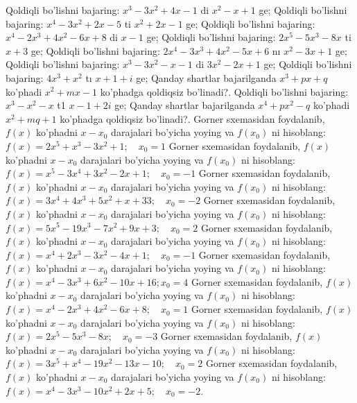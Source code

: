 Qoldiqli bo’lishni bajaring:  $x^3-3 x^2+4 x-1$ di $x^2-x+1$ ge;
Qoldiqli bo’lishni bajaring: $x^4-3 x^2+2 x-5$ ti $x^2+2 x-1$ ge;
Qoldiqli bo’lishni bajaring: $x^4-2 x^3+4 x^2-6 x+8$ di $x-1$ ge;
Qoldiqli bo’lishni bajaring: $2 x^5-5 x^3-8 x$ ti $x+3$ ge;
Qoldiqli bo’lishni bajaring: $2 x^4-3 x^3+4 x^2-5 x+6$ nı $x^2-3 x+1$ ge;
Qoldiqli bo’lishni bajaring: $x^3-3 x^2-x-1$ di $3 x^2-2 x+1$ ge;
Qoldiqli bo’lishni bajaring: $4 x^3+x^2$ tı $x+1+i$ ge;
Qanday shartlar bajarilganda $x^3+p x+q$ ko’phadi $x^2+m x-1$ ko’phadga qoldiqsiz bo’linadi?.
Qoldiqli bo’lishni bajaring:  $x^3-x^2-x$ t1 $x-1+2 i$ ge;
Qanday shartlar bajarilganda $x^4+p x^2-q$ ko’phadi $x^2+m q+1$ ko’phadga qoldiqsiz bo’linadi?.
Gorner sxemasidan foydalanib, $f(x)$ ko’phadni $x-x_0$ darajalari bo’yicha yoying va $f\left(x_0\right)$ ni hisoblang:  $f(x)=2 x^5+x^3-3 x^2+1 ; \quad x_0=1$
Gorner sxemasidan foydalanib, $f(x)$ ko’phadni $x-x_0$ darajalari bo’yicha yoying va $f\left(x_0\right)$ ni hisoblang: $f(x)=x^5-3 x^4+3 x^2-2 x+1 ; \quad x_0=-1$
Gorner sxemasidan foydalanib, $f(x)$ ko’phadni $x-x_0$ darajalari bo’yicha yoying va $f\left(x_0\right)$ ni hisoblang: $f(x)=3 x^4+4 x^3+5 x^2+x+33 ; \quad x_0=-2$
Gorner sxemasidan foydalanib, $f(x)$ ko’phadni $x-x_0$ darajalari bo’yicha yoying va $f\left(x_0\right)$ ni hisoblang: $f(x)=5 x^5-19 x^3-7 x^2+9 x+3 ; \quad x_0=2$
Gorner sxemasidan foydalanib, $f(x)$ ko’phadni $x-x_0$ darajalari bo’yicha yoying va $f\left(x_0\right)$ ni hisoblang: $f(x)=x^4+2 x^3-3 x^2-4 x+1 ; \quad x_0=-1$
Gorner sxemasidan foydalanib, $f(x)$ ko’phadni $x-x_0$ darajalari bo’yicha yoying va $f\left(x_0\right)$ ni hisoblang: $f(x)=x^4-3 x^3+6 x^2-10 x+16 ; x_0=4$
Gorner sxemasidan foydalanib, $f(x)$ ko’phadni $x-x_0$ darajalari bo’yicha yoying va $f\left(x_0\right)$ ni hisoblang: $f(x)=x^4-2 x^3+4 x^2-6 x+8 ; \quad x_0=1$
Gorner sxemasidan foydalanib, $f(x)$ ko’phadni $x-x_0$ darajalari bo’yicha yoying va $f\left(x_0\right)$ ni hisoblang: $f(x)=2 x^5-5 x^3-8 x ; \quad x_0=-3$
Gorner sxemasidan foydalanib, $f(x)$ ko’phadni $x-x_0$ darajalari bo’yicha yoying va $f\left(x_0\right)$ ni hisoblang: $f(x)=3 x^5+x^4-19 x^2-13 x-10 ; \quad x_0=2$
Gorner sxemasidan foydalanib, $f(x)$ ko’phadni $x-x_0$ darajalari bo’yicha yoying va $f\left(x_0\right)$ ni hisoblang: $f(x)=x^4-3 x^3-10 x^2+2 x+5 ; \quad x_0=-2$.